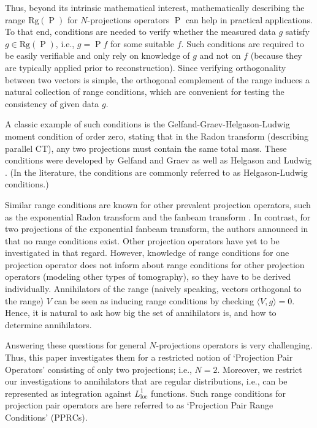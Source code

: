 \documentclass[12pt]{article}
\DeclareMathOperator{\Projbasic}{P}
\newcommand{\rg}[1]{\mathrm{Rg}({#1})}
\newcommand{\conditionname}{$\mathrm{PPRC}$}
\begin{document}
Thus, beyond its intrinsic mathematical interest, mathematically describing the range $\rg{\Projbasic}$ for $N$-projections operators $\Projbasic$ can help in practical applications. To that end, conditions are needed to verify whether the measured data $g$ satisfy $g\in \rg{\Projbasic}$, i.e., $g=\Projbasic f$ for some suitable $f$. Such conditions are required to be easily verifiable and only rely on knowledge of $g$ and not on $f$ (because they are typically applied prior to reconstruction). 
Since verifying orthogonality between two vectors is simple, the orthogonal complement of the range induces a natural collection of range conditions, which are convenient for testing the consistency of given data $g$.

A classic example of such conditions is the Gelfand-Graev-Helgason-Ludwig moment condition of order zero, stating that in the Radon transform (describing parallel CT), any two projections must contain the same total mass. These conditions were developed by Gelfand and Graev  \cite{WOS:A1960WE64800004} as well as Helgason and Ludwig \cite{10.1007/BF02391776,Ludwig_66}. 
(In the literature, the conditions are commonly referred to as Helgason-Ludwig conditions.)

Similar range conditions are known for other prevalent projection operators, such as the exponential Radon transform and the fanbeam transform \cite{doi:10.1080/01630568308816147,V_Aguilar_1995,new_data_consistency_fanbeam, Levine2010ConsistencyCF,Ludwig_66,helgason2013radon,6495510}.
In contrast, for two projections of the exponential fanbeam transform,  the authors announced in \cite{Huber_fully_3d_2023} that no range conditions exist. Other projection operators have yet to be investigated in that regard.
However, knowledge of range conditions for one projection operator does not inform about range conditions for other projection operators (modeling other types of tomography), so they have to be derived individually.
Annihilators of the range (naively speaking, vectors orthogonal to the range) $V$ can be seen as inducing range conditions by checking $\langle V,g\rangle =0$. Hence, it is natural to ask how big the set of annihilators is, and how to determine annihilators.

Answering these questions for general $N$-projections operators is very challenging. Thus, this paper investigates them for a restricted notion of `Projection Pair Operators' consisting of only two projections; i.e., $N=2$. Moreover, we restrict our investigations to annihilators that are regular distributions, i.e., can be represented as integration against $L^1_\text{loc}$ functions.
Such range conditions for projection pair operators are here referred to as `Projection Pair Range Conditions' (\conditionname s).
\end{document}
